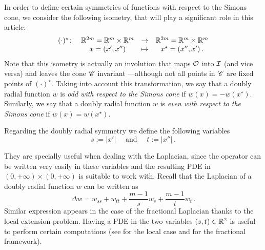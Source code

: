 In order to define certain symmetries of functions with respect to the Simons cone, we consider the following isometry, that will play a significant role in this article:
\begin{equation}
\label{Eq:DefStar}
\begin{matrix}
(\cdot)^\star \colon & \mathbb{R}^{2m}= \mathbb{R}^{m}\times \mathbb{R}^{m}  &\to&  \mathbb{R}^{2m}= \mathbb{R}^{m}\times \mathbb{R}^{m}  \\
& x = (x',x'') &\mapsto & x^\star = (x'',x')\,.
\end{matrix}
\end{equation}
Note that this isometry is actually an involution that maps $\mathcal{O}$ into $\mathcal{I}$ (and vice versa) and leaves the cone $\mathscr{C}$ invariant ---although not all points in $\mathscr{C}$ are fixed points of $(\cdot)^\star$. Taking into account this transformation, we say that a doubly radial function $w$ is \emph{odd with respect to the Simons cone} if $w(x) = -w(x^\star)$. Similarly, we say that a doubly radial function $w$ is \emph{even with respect to the Simons cone} if $w(x) = w(x^\star)$.

Regarding the doubly radial symmetry we define the following variables
$$
s := |x'| \quad \text{ and } \quad t:=|x''|\,.
$$

They are specially useful when dealing with the Laplacian, since the operator can be written very easily in these variables and the resulting PDE in $(0,+\infty)\times (0,+\infty)$ is suitable to work with. Recall that the Laplacian of a doubly radial function $w$ can be written as
\begin{equation}
\label{Eq:Laplacian-st}
\Delta w = w_{ss} + w_{tt} + \frac{m-1}{s}w_s + \frac{m-1}{t}w_t\,.
\end{equation}
Similar expression appears in the case of the fractional Laplacian thanks to the local extension problem. Having a PDE in the two variables $(s,t)\in \mathbb{R}^2$ is useful to perform certain computations (see \cite{CabreTerraI, CabreTerraII,Cabre-Saddle, CabreRosOton-DoubleRev} for the local case and \cite{Cinti-Saddle, Cinti-Saddle2, Felipe-Sanz-Perela:SaddleFractional} for the fractional framework).

